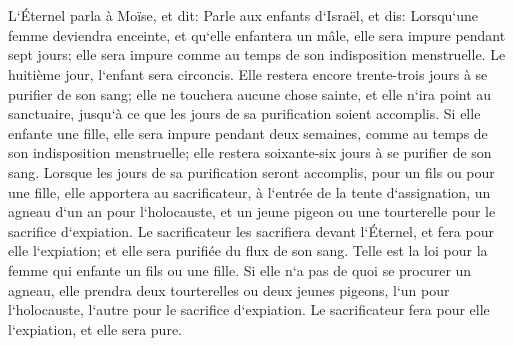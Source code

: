 \chapter{}

\verse L`Éternel parla à Moïse, et dit: 
\verse Parle aux enfants d`Israël, et dis: Lorsqu`une femme deviendra enceinte, et qu`elle enfantera un mâle, elle sera impure pendant sept jours; elle sera impure comme au temps de son indisposition menstruelle. 
\verse Le huitième jour, l`enfant sera circoncis. 
\verse Elle restera encore trente-trois jours à se purifier de son sang; elle ne touchera aucune chose sainte, et elle n`ira point au sanctuaire, jusqu`à ce que les jours de sa purification soient accomplis. 
\verse Si elle enfante une fille, elle sera impure pendant deux semaines, comme au temps de son indisposition menstruelle; elle restera soixante-six jours à se purifier de son sang. 
\verse Lorsque les jours de sa purification seront accomplis, pour un fils ou pour une fille, elle apportera au sacrificateur, à l`entrée de la tente d`assignation, un agneau d`un an pour l`holocauste, et un jeune pigeon ou une tourterelle pour le sacrifice d`expiation. 
\verse Le sacrificateur les sacrifiera devant l`Éternel, et fera pour elle l`expiation; et elle sera purifiée du flux de son sang. Telle est la loi pour la femme qui enfante un fils ou une fille. 
\verse Si elle n`a pas de quoi se procurer un agneau, elle prendra deux tourterelles ou deux jeunes pigeons, l`un pour l`holocauste, l`autre pour le sacrifice d`expiation. Le sacrificateur fera pour elle l`expiation, et elle sera pure. 

\chapter{}

